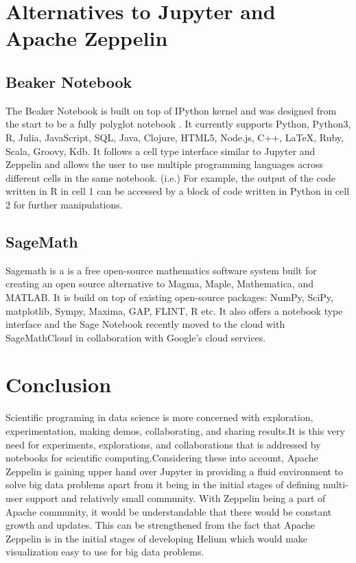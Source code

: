 \documentclass[9pt,twocolumn,twoside]{ ../../styles/osajnl}
\begin{document}
\section{Alternatives to Jupyter and Apache Zeppelin}
\subsection{Beaker Notebook}
The Beaker Notebook is built on top of IPython kernel and  was designed from the start to be a fully polyglot notebook \cite{www-beaker}. It currently supports Python, Python3, R, Julia, JavaScript, SQL, Java, Clojure, HTML5, Node.js, C++, LaTeX, Ruby, Scala, Groovy, Kdb. It follows a cell type interface similar to Jupyter and Zeppelin and allows the user to use multiple programming languages across different cells in the same notebook. (i.e.) For example, the output of the code written in R in cell 1 can be accessed by a block of code written in Python in cell 2 for further manipulations.

\subsection{SageMath}
Sagemath is a is a free open-source mathematics software system \cite{www-sagemath} built for creating an open source alternative to Magma, Maple, Mathematica, and MATLAB. It is build on top of  existing open-source packages: NumPy, SciPy, matplotlib, Sympy, Maxima, GAP, FLINT, R etc. It also offers a notebook type interface and the Sage Notebook recently moved to the cloud with SageMathCloud in collaboration with Google’s cloud services.

\section{Conclusion}

Scientific programing in data science is more concerned with exploration, experimentation, making demos, collaborating, and sharing results.It is this very need for experiments, explorations, and collaborations that is addressed by notebooks for scientific computing.Considering these into account, Apache Zeppelin is gaining upper hand over Jupyter in providing a fluid environment to solve big data problems apart from it being in the initial stages of defining multi-user support and relatively small community. With Zeppelin being a part of Apache community, it would be understandable that there would be constant growth and updates. This can be strengthened from the fact that Apache Zeppelin is in the initial stages of developing Helium which would make visualization easy to use for big data problems.


\end{document}
